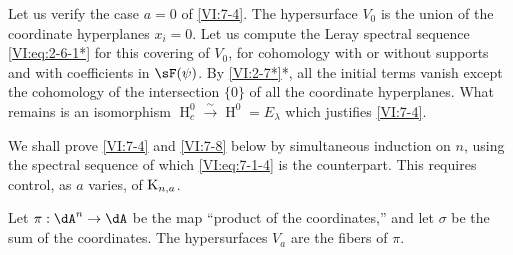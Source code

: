 \documentclass[oneside]{book}
\DeclareMathOperator{\h}{H}
\newcommand{\iso}{\xrightarrow\sim}
\newcommand{\kloos}{\textnormal{K}} %
\theoremstyle{sga-source}
\theoremstyle{sga-source-dash}
\theoremstyle{sga-source-dotdash}
\theoremstyle{sga-source-number-note-dash}
\theoremstyle{sga-source-note-number-dotdash}
\theoremstyle{sga-source-example-dotdash}
\theoremstyle{sga-source-inline-number}
\theoremstyle{sga-source-bare-number}
\theoremstyle{sga-source}
\begin{document}
Let us verify the case $a=0$ of \ref{VI:7-4}. The hypersurface $V_0$ is the union 
of the coordinate hyperplanes $x_i=0$. Let us compute the Leray spectral sequence 
\eqref{VI:eq:2-6-1*} for this covering of $V_0$, for cohomology with or 
without supports and with coefficients in $\sF(\psi)$. By \ref{VI:2-7*}*, all 
the initial terms vanish except the cohomology of the intersection $\{0\}$ of 
all the coordinate hyperplanes. What remains is an isomorphism 
$\h_c^0{}\iso \h^0{}=E_\lambda$ which justifies \ref{VI:7-4}. 

We shall prove \ref{VI:7-4} and \ref{VI:7-8} below by simultaneous induction 
on $n$, using the spectral sequence of which 
\eqref{VI:eq:7-1-4} is the counterpart. This requires control, as $a$ varies, 
of $\kloos_{n,a}$. 

Let $\pi:\dA^n \to \dA$ be the map ``product of the coordinates,'' and let 
$\sigma$ be the sum of the coordinates. The hypersurfaces $V_a$ are the fibers of 
$\pi$.
\end{document}
